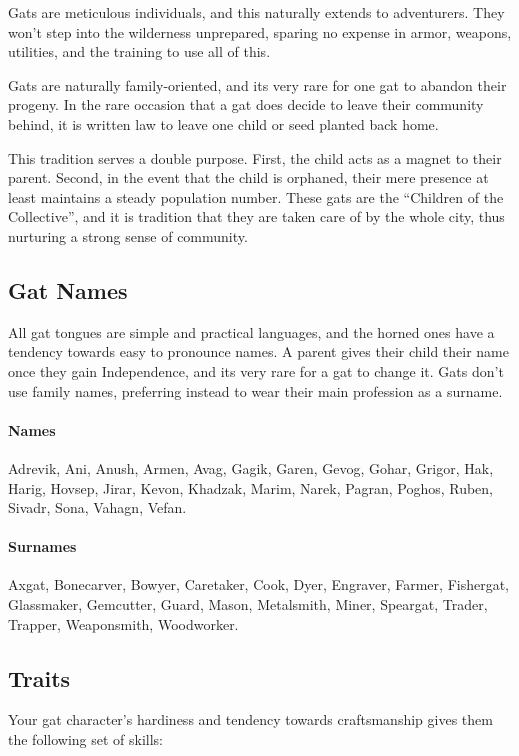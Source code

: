 \begin{linenumbers}
Gats are meticulous individuals, and this naturally extends to adventurers.
They won't step into the wilderness unprepared, sparing no expense in armor, weapons, utilities, and the training to use all of this.

Gats are naturally family-oriented, and its very rare for one gat to abandon their progeny.
In the rare occasion that a gat does decide to leave their community behind, it is written law to leave one child or seed planted back home.

This tradition serves a double purpose.
First, the child acts as a magnet to their parent.
Second, in the event that the child is orphaned, their mere presence at least maintains a steady population number.
These gats are the ``Children of the Collective'', and it is tradition that they are taken care of by the whole city, thus nurturing a strong sense of community.

\subsection*{Gat Names}
All gat tongues are simple and practical languages, and the horned ones have a tendency towards easy to pronounce names.
A parent gives their child their name once they gain Independence, and its very rare for a gat to change it.
Gats don't use family names, preferring instead to wear their main profession as a surname.

\paragraph{Names} Adrevik, Ani, Anush, Armen, Avag, Gagik, Garen, Gevog, Gohar, Grigor, Hak, Harig, Hovsep, Jirar, Kevon, Khadzak, Marim, Narek, Pagran, Poghos, Ruben, Sivadr, Sona, Vahagn, Vefan.

\paragraph{Surnames} Axgat, Bonecarver, Bowyer, Caretaker, Cook, Dyer, Engraver, Farmer, Fishergat, Glassmaker, Gemcutter, Guard, Mason, Metalsmith, Miner, Speargat, Trader, Trapper, Weaponsmith, Woodworker.

\subsection*{Traits}
Your gat character's hardiness and tendency towards craftsmanship gives them the following set of skills:


\end{linenumbers}
